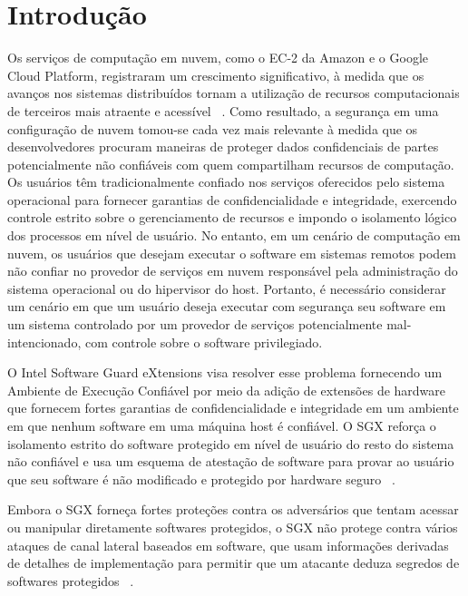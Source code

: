 \documentclass[review]{elsarticle}
\begin{document}
\linenumbers

\section{Introdução}

Os serviços de computação em nuvem, como o EC-2 da Amazon e o Google Cloud Platform, registraram um crescimento significativo, à medida que os avanços nos sistemas distribuídos tornam a utilização de recursos computacionais de terceiros mais atraente e acessível ~\cite{lunden_amazons_2015}. Como resultado, a segurança em uma configuração de nuvem tomou-se cada vez mais relevante à medida que os desenvolvedores procuram maneiras de proteger dados confidenciais de partes potencialmente não confiáveis com quem compartilham recursos de computação. Os usuários têm tradicionalmente confiado nos serviços oferecidos pelo sistema operacional para fornecer garantias de confidencialidade e integridade, exercendo controle estrito sobre o gerenciamento de recursos e impondo o isolamento lógico dos processos em nível de usuário. No entanto, em um cenário de computação em nuvem, os usuários que desejam executar o software em sistemas remotos podem não confiar no provedor de serviços em nuvem responsável pela administração do sistema operacional ou do hipervisor do host. Portanto, é necessário considerar um cenário em que um usuário deseja executar com segurança seu software em um sistema controlado por um provedor de serviços potencialmente mal-intencionado, com controle sobre o software privilegiado.

O Intel Software Guard eXtensions visa resolver esse problema fornecendo um Ambiente de Execução Confiável por meio da adição de extensões de hardware que fornecem fortes garantias de confidencialidade e integridade em um ambiente em que nenhum software em uma máquina host é confiável. O SGX reforça o isolamento estrito do software protegido em nível de usuário do resto do sistema não confiável e usa um esquema de atestação de software para provar ao usuário que seu software é não modificado e protegido por hardware seguro ~\cite{intel_corporation_intel_2016}.

Embora o SGX forneça fortes proteções contra os adversários que tentam acessar ou manipular diretamente softwares protegidos, o SGX não protege contra vários ataques de canal lateral baseados em software, que usam informações derivadas de detalhes de implementação para permitir que um atacante deduza segredos de softwares protegidos ~\cite{costan_intel_2016}.
\end{document}

